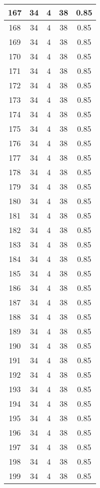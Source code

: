 \documentclass[letterpaper, 12pt]{article}
\begin{document}
\begin{longtable}{|c|c|c|c|c|}
\hline
167 & 34 & 4 & 38 & 0.85 \\
\hline
168 & 34 & 4 & 38 & 0.85 \\
\hline
169 & 34 & 4 & 38 & 0.85 \\
\hline
170 & 34 & 4 & 38 & 0.85 \\
\hline
171 & 34 & 4 & 38 & 0.85 \\
\hline
172 & 34 & 4 & 38 & 0.85 \\
\hline
173 & 34 & 4 & 38 & 0.85 \\
\hline
174 & 34 & 4 & 38 & 0.85 \\
\hline
175 & 34 & 4 & 38 & 0.85 \\
\hline
176 & 34 & 4 & 38 & 0.85 \\
\hline
177 & 34 & 4 & 38 & 0.85 \\
\hline
178 & 34 & 4 & 38 & 0.85 \\
\hline
179 & 34 & 4 & 38 & 0.85 \\
\hline
180 & 34 & 4 & 38 & 0.85 \\
\hline
181 & 34 & 4 & 38 & 0.85 \\
\hline
182 & 34 & 4 & 38 & 0.85 \\
\hline
183 & 34 & 4 & 38 & 0.85 \\
\hline
184 & 34 & 4 & 38 & 0.85 \\
\hline
185 & 34 & 4 & 38 & 0.85 \\
\hline
186 & 34 & 4 & 38 & 0.85 \\
\hline
187 & 34 & 4 & 38 & 0.85 \\
\hline
188 & 34 & 4 & 38 & 0.85 \\
\hline
189 & 34 & 4 & 38 & 0.85 \\
\hline
190 & 34 & 4 & 38 & 0.85 \\
\hline
191 & 34 & 4 & 38 & 0.85 \\
\hline
192 & 34 & 4 & 38 & 0.85 \\
\hline
193 & 34 & 4 & 38 & 0.85 \\
\hline
194 & 34 & 4 & 38 & 0.85 \\
\hline
195 & 34 & 4 & 38 & 0.85 \\
\hline
196 & 34 & 4 & 38 & 0.85 \\
\hline
197 & 34 & 4 & 38 & 0.85 \\
\hline
198 & 34 & 4 & 38 & 0.85 \\
\hline
199 & 34 & 4 & 38 & 0.85 \\
\hline
\end{longtable}
\end{document}
